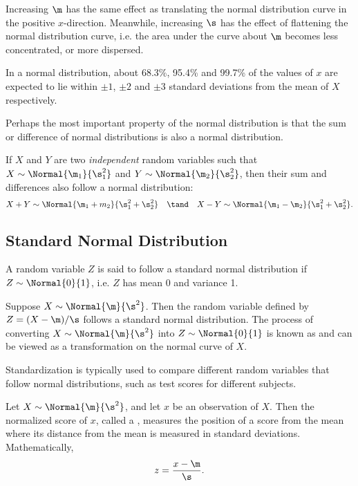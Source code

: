 \medskip

Increasing $\m$ has the same effect as translating the normal distribution curve in the positive $x$-direction. Meanwhile, increasing $\s$ has the effect of flattening the normal distribution curve, i.e. the area under the curve about $\m$ becomes less concentrated, or more dispersed.

In a normal distribution, about 68.3\%, 95.4\% and 99.7\% of the values of $x$ are expected to lie within $\pm 1$, $\pm 2$ and $\pm 3$ standard deviations from the mean of $X$ respectively.

Perhaps the most important property of the normal distribution is that the sum or difference of normal distributions is also a normal distribution.

\begin{proposition}
    If $X$ and $Y$ are two \emph{independent} random variables such that $X \sim \Normal{\m_1}{\s_1^2}$ and $Y \sim \Normal{\m_2}{\s_2^2}$, then their sum and differences also follow a normal distribution: \[X + Y \sim \Normal{\m_1 + m_2}{\s_1^2 + \s_2^2} \quad \tand \quad X - Y \sim \Normal{\m_1 - \m_2}{\s_1^2 + \s_2^2}.\]
\end{proposition}

\subsection{Standard Normal Distribution}

\begin{definition}
    A random variable $Z$ is said to follow a standard normal distribution if $Z \sim \Normal{0}{1}$, i.e. $Z$ has mean 0 and variance 1.
\end{definition}

Suppose $X \sim \Normal{\m}{\s^2}$. Then the random variable defined by $Z = (X - \m)/\s$ follows a standard normal distribution. The process of converting $X \sim \Normal{\m}{\s^2}$ into $Z \sim \Normal{0}{1}$ is known as  and can be viewed as a transformation on the normal curve of $X$.

Standardization is typically used to compare different random variables that follow normal distributions, such as test scores for different subjects.

\begin{definition}
    Let $X \sim \Normal{\m}{\s^2}$, and let $x$ be an observation of $X$. Then the normalized score of $x$, called a , measures the position of a score from the mean where its distance from the mean is measured in standard deviations. Mathematically, \[z = \frac{x - \m}{\s}.\]
\end{definition}

